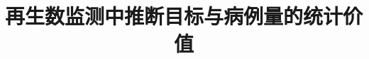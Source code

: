 \documentclass[authoryear,preprint,10pt,fleqn]{elsarticle}
\theoremstyle{remark}\newtheorem{remark}{注}
\begin{document}
\begin{frontmatter}
\title{再生数监测中推断目标与病例量的统计价值}

\end{frontmatter}







\FloatBarrier


\FloatBarrier

\end{document}
